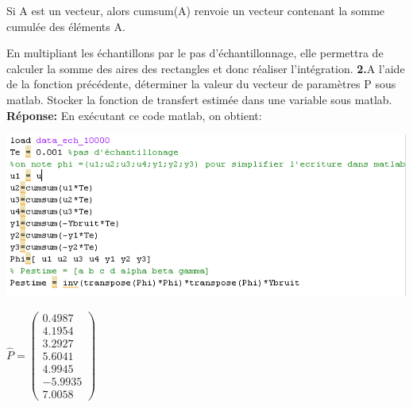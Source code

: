 \documentclass[12pt]{article}
\begin{document}
    Si A est un vecteur, alors cumsum(A) renvoie un vecteur contenant la somme cumulée des éléments A.

En multipliant les échantillons par le pas d'échantillonnage, elle permettra de calculer la somme des aires des rectangles et donc réaliser l'intégration.
\medbreak
\textbf{2.}A l'aide de la fonction précédente, déterminer la valeur du vecteur de paramètres P sous matlab. Stocker la fonction de transfert estimée dans une variable sous matlab.
\smallbreak
\textbf{Réponse:}
\smallbreak
En exécutant ce code matlab, on obtient:

\begin{flushleft}
\includegraphics{2_2.PNG}
\end{flushleft}

$\hat{P}=
\begin{pmatrix}
0.4987\\
 4.1954\\
 3.2927\\
5.6041 \\
 4.9945\\
   -5.9935\\
   7.0058
\end{pmatrix}
$
\end{document}
